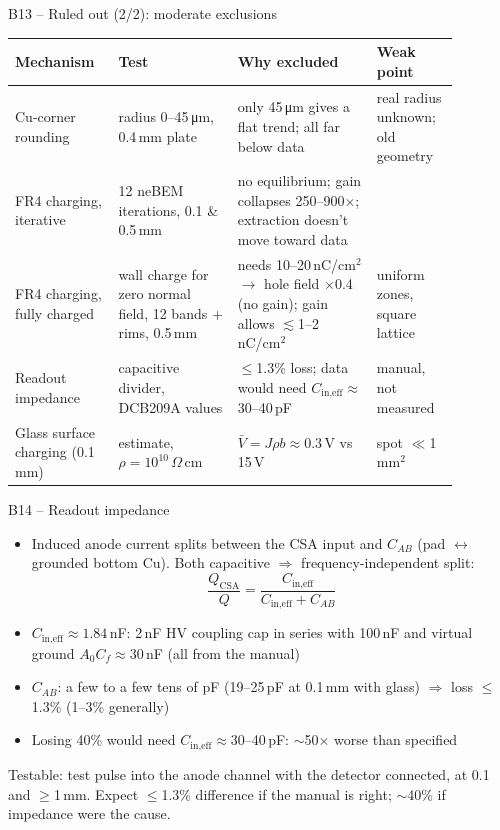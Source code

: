 \documentclass[aspectratio=169,11pt]{beamer}
\newcommand{\backlink}[1]{\hfill\hyperlink{#1}{\beamerreturnbutton{back}}}
\newcommand{\takeaway}[1]{%
  \vspace{4pt}\colorbox{boxbg}{\parbox{\dimexpr\linewidth-2\fboxsep}{\small #1}}}
\begin{document}
\begin{frame}[label=b-ruled2]{B13 -- Ruled out (2/2): moderate exclusions}
  \centering\footnotesize
  \begin{tabular}{L{0.19\linewidth}L{0.24\linewidth}L{0.29\linewidth}L{0.16\linewidth}}\toprule
    Mechanism & Test & Why excluded & Weak point\\\midrule
    Cu-corner rounding & radius 0--45\,\si{\micro m}, 0.4\,mm plate & only 45\,\si{\micro m} gives a flat trend; all far below data & real radius unknown; old geometry\\
    FR4 charging, iterative & 12 neBEM iterations, 0.1 \& 0.5\,mm & no equilibrium; gain collapses 250--900$\times$; extraction doesn't move toward data & \\
    FR4 charging, fully charged & wall charge for zero normal field, 12 bands + rims, 0.5\,mm & needs 10--20\,nC/cm$^2$ $\to$ hole field $\times$0.4 (no gain); gain allows $\lesssim$1--2\,nC/cm$^2$ & uniform zones, square lattice\\
    Readout impedance & capacitive divider, DCB209A values & $\le$1.3\% loss; data would need $C_\text{in,eff}\approx$30--40\,pF & manual, not measured\\
    Glass surface charging (0.1\,mm) & estimate, $\rho=10^{10}\,\Omega\,$cm & $\bar V = J\rho b\approx0.3$\,V vs 15\,V & spot $\ll$1\,mm$^2$\\\bottomrule
  \end{tabular}
  \backlink{m-ruled}
\end{frame}

\begin{frame}[label=b-imp]{B14 -- Readout impedance}
  \small
  \begin{itemize}
    \item Induced anode current splits between the CSA input and $C_{AB}$ (pad $\leftrightarrow$ grounded bottom Cu). Both capacitive $\Rightarrow$ frequency-independent split:
      \[ \frac{Q_\text{CSA}}{Q} = \frac{C_\text{in,eff}}{C_\text{in,eff} + C_{AB}} \]
    \item $C_\text{in,eff}\approx1.84$\,nF: 2\,nF HV coupling cap in series with 100\,nF and virtual ground $A_0C_f\approx30$\,nF (all from the manual)
    \item $C_{AB}$: a few to a few tens of pF (19--25\,pF at 0.1\,mm with glass) $\Rightarrow$ loss $\le$1.3\% (1--3\% generally)
    \item Losing 40\% would need $C_\text{in,eff}\approx$30--40\,pF: $\sim$50$\times$ worse than specified
  \end{itemize}
  \takeaway{Testable: test pulse into the anode channel with the detector connected, at 0.1 and $\ge$1\,mm. Expect $\le$1.3\% difference if the manual is right; $\sim$40\% if impedance were the cause.}
  \backlink{m-ruled}
\end{frame}
\end{document}
